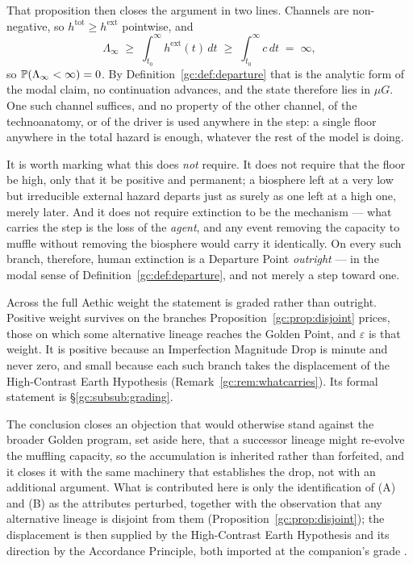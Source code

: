 \begin{example}
That proposition then closes the argument in two lines. Channels are
non-negative, so $h^{\mathrm{tot}}\ge h^{\mathrm{ext}}$ pointwise, and
\[
\Lambda_\infty\;\ge\;\int_{t_0}^{\infty}h^{\mathrm{ext}}(t)\,dt
\;\ge\;\int_{t_0}^{\infty}c\,dt\;=\;\infty ,
\]
so $\mathbb{P}(\Lambda_\infty<\infty)=0$. By
Definition~\ref{gc:def:departure} that is the analytic form of the
modal claim, no continuation advances, and the state therefore
lies in $\mu G$. One such channel suffices, and no property of the
other channel, of the technoanatomy, or of the driver is used anywhere in the
step: a single floor anywhere in the total hazard is enough, whatever
the rest of the model is doing.

It is worth marking what this does \emph{not} require. It does not
require that the floor be high, only that it be positive and permanent;
a biosphere left at a very low but irreducible external hazard departs
just as surely as one left at a high one, merely later. And it does not
require extinction to be the mechanism --- what carries the step is the
loss of the \emph{agent}, and any event removing the capacity to muffle
without removing the biosphere would carry it identically.
On every such branch, therefore, human extinction is a Departure Point
\emph{outright} --- in the modal sense of
Definition~\ref{gc:def:departure}, and not merely a step toward one.

Across the full Aethic weight the statement is graded rather than
outright. Positive weight survives on the branches
Proposition~\ref{gc:prop:disjoint} prices, those on which some
alternative lineage reaches the Golden Point, and $\varepsilon$ is
that weight. It is positive because an Imperfection Magnitude Drop is
minute and never zero, and small because each such branch takes the
displacement of the High-Contrast Earth Hypothesis
(Remark~\ref{gc:rem:whatcarries}). Its formal statement is
\S\ref{gc:subsub:grading}.

\begin{remark}
\label{gc:rem:whatcarries}
The conclusion closes an objection that would otherwise stand against
the broader Golden program, set aside here, that a successor lineage might re-evolve the muffling
capacity, so the accumulation is inherited rather than forfeited, and
it closes it with the same machinery that establishes the drop, not
with an additional argument. What is contributed here is only the
identification of (A) and (B) as the attributes perturbed, together
with the observation that any alternative lineage is disjoint from them
(Proposition~\ref{gc:prop:disjoint}); the displacement is then supplied
by the High-Contrast Earth Hypothesis and its direction by the
Accordance Principle, both imported at the companion's grade
\cite{Nexus,AethusOptimalEarth}.


\end{remark}
\end{example}
